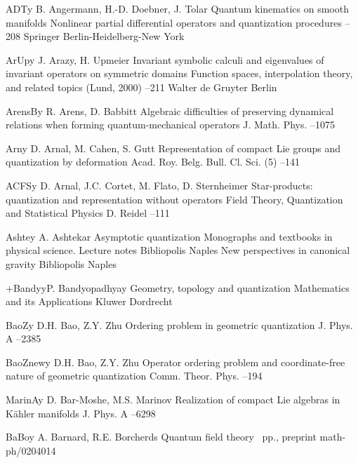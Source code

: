 \documentclass[12pt]{amsart}
\numberwithin{equation}{section}
\theoremstyle{remark}
\newcommand{\by}{\mathbf y}
\begin{document}
\begin{thebibliography}{199}
 ADT\by{ B. Angermann, H.-D. Doebner, J. Tolar \paper Quantum kinematics
on smooth manifolds \inbook Nonlinear partial differential operators and
quantization procedures --208 \publ Springer \publaddr
Berlin-Heidelberg-New York }

 ArUp\by{ J. Arazy, H. Upmeier \paper Invariant symbolic calculi and
eigenvalues of invariant operators on symmetric domains \inbook Function
spaces, interpolation theory, and related topics (Lund, 2000)  --211 \publ
Walter de Gruyter \publaddr Berlin }

 ArensB\by{ R. Arens, D. Babbitt \paper Algebraic difficulties of
preserving dynamical relations when forming quantum-mechanical operators
\jour J. Math. Phys.   --1075}

 Arn\by{ D. Arnal, M. Cahen, S. Gutt \paper Representation of compact Lie
groups and quantization by deformation \jour Acad. Roy. Belg. Bull. Cl. Sci.
(5)   --141}

 ACFS\by{ D. Arnal, J.C. Cortet, M. Flato, D. Sternheimer \paper
Star-products: quantization and representation without operators \inbook Field
Theory, Quantization and Statistical Physics \publ D. Reidel  --111}

 Ashte\by{ A. Ashtekar \book Asymptotic quantization \bookinfo Monographs
and textbooks in physical science. Lecture notes  \publ Bibliopolis
\publaddr Naples  \moreref \book New perspectives in canonical gravity
\publ Bibliopolis \publaddr Naples }

 +Bandy\by{P. Bandyopadhyay \book Geometry, topology and quantization
\bookinfo Mathematics and its Applications  \publ Kluwer \publaddr
Dordrecht }

 BaoZ\by{ D.H. Bao, Z.Y. Zhu \paper Ordering problem in geometric
quantization \jour J. Phys. A   --2385}

 BaoZnew\by{ D.H. Bao, Z.Y. Zhu \paper Operator ordering problem and
coordinate-free nature of geometric quantization \jour Comm. Theor. Phys.
  --194}

 MarinA\by{ D. Bar-Moshe, M.S. Marinov \paper Realization of compact Lie
algebras in K\"ahler manifolds \jour J. Phys. A   --6298}

 BaBo\by{ A. Barnard, R.E. Borcherds \paper Quantum field theory
~pp., preprint math-ph/0204014}


\end{thebibliography}
\end{document}
